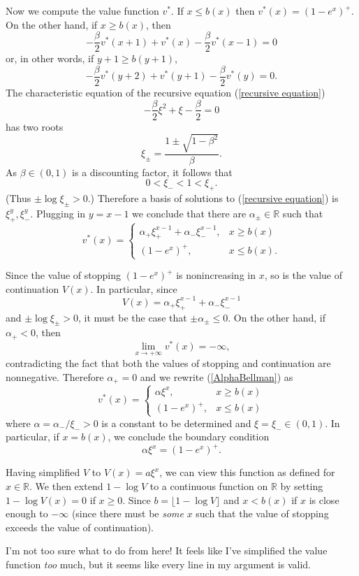 \documentclass[10pt]{article}
\newcommand{\RR}{\mathbb{R}}
\theoremstyle{definition}
\begin{document}
Now we compute the value function $v^*$. If $x \leq b(x)$ then $v^*(x) = (1 - e^x)^+$.
On the other hand, if $x \geq b(x)$, then
$$- \frac{\beta}{2} v^*(x + 1) + v^*(x) - \frac{\beta}{2} v^*(x - 1) = 0$$
or, in other words, if $y + 1 \geq b(y + 1)$,
\begin{equation}
\label{recursive equation}
- \frac{\beta}{2} v^*(y + 2) + v^*(y + 1) - \frac{\beta}{2} v^*(y) = 0.
\end{equation}
The characteristic equation of the recursive equation (\ref{recursive equation})
$$- \frac{\beta}{2} \xi^2 + \xi - \frac{\beta}{2} = 0$$
has two roots
$$\xi_\pm = \frac{1 \pm \sqrt{1 - \beta^2}}{\beta}.$$
As $\beta \in (0, 1)$ is a discounting factor, it follows that
$$0 < \xi_- < 1 < \xi_+.$$
(Thus $\pm \log \xi_\pm > 0$.)
Therefore a basis of solutions to (\ref{recursive equation}) is $\xi_+^y, \xi_-^y$.
Plugging in $y = x - 1$ we conclude that there are $\alpha_\pm \in \RR$ such that
\begin{equation}
\label{AlphaBellman}
v^*(x) = \begin{cases}
\alpha_+ \xi_+^{x - 1} + \alpha_- \xi_-^{x - 1} , &x \geq b(x)\\
(1 - e^x)^+, &x \leq b(x).
\end{cases}
\end{equation}

Since the value of stopping $(1 - e^x)^+$ is nonincreasing in $x$, so is the value of continuation $V(x)$.
In particular, since
$$V(x) = \alpha_+ \xi_+^{x-1} + \alpha_- \xi_-^{x - 1}$$
and $\pm \log \xi_\pm > 0$, it must be the case that $\pm \alpha_\pm \leq 0$.
On the other hand, if $\alpha_+ < 0$, then
$$\lim_{x \to +\infty} v^*(x) = -\infty,$$
contradicting the fact that both the values of stopping and continuation are nonnegative.
Therefore $\alpha_+ = 0$ and we rewrite (\ref{AlphaBellman}) as
$$v^*(x) = \begin{cases}
\alpha \xi^x, &x \geq b(x)\\
(1 - e^x)^+, &x \leq b(x)
\end{cases}$$
where $\alpha = \alpha_-/\xi_- > 0$ is a constant to be determined and $\xi = \xi_- \in (0, 1)$.
In particular, if $x = b(x)$, we conclude the boundary condition
$$\alpha \xi^x = (1 - e^x)^+.$$

Having simplified $V$ to $V(x) = a\xi^x$, we can view this function as defined for $x \in \RR$.
We then extend $1 - \log V$ to a continuous function on $\RR$ by setting $1 - \log V(x) = 0$ if $x \geq 0$.
Since $b = \lfloor 1 - \log V \rfloor$ and $x < b(x)$ if $x$ is close enough to $-\infty$ (since there must be \emph{some} $x$ such that the value of stopping exceeds the value of continuation).

I'm not too sure what to do from here! It feels like I've simplified the value function \emph{too} much, but it seems like every line in my argument is valid.
\end{document}

